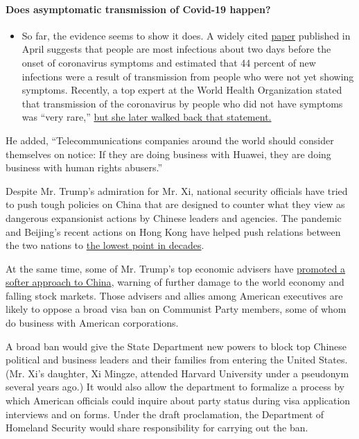 \begin{itemize}
{  \paragraph{Does asymptomatic transmission of Covid-19
  happen?}\label{does-asymptomatic-transmission-of-covid-19-happen}}

  \begin{itemize}
  \tightlist
  \item
    So far, the evidence seems to show it does. A widely cited
    \href{https://www.nature.com/articles/s41591-020-0869-5}{paper}
    published in April suggests that people are most infectious about
    two days before the onset of coronavirus symptoms and estimated that
    44 percent of new infections were a result of transmission from
    people who were not yet showing symptoms. Recently, a top expert at
    the World Health Organization stated that transmission of the
    coronavirus by people who did not have symptoms was ``very rare,''
    \href{https://www.nytimes.com/2020/06/09/world/coronavirus-updates.html?action=click\&pgtype=Article\&state=default\&region=MAIN_CONTENT_3\&context=storylines_faq\#link-1f302e21}{but
    she later walked back that statement.}
  \end{itemize}
\end{itemize}

He added, ``Telecommunications companies around the world should
consider themselves on notice: If they are doing business with Huawei,
they are doing business with human rights abusers.''

Despite Mr. Trump's admiration for Mr. Xi, national security officials
have tried to push tough policies on China that are designed to counter
what they view as dangerous expansionist actions by Chinese leaders and
agencies. The pandemic and Beijing's recent actions on Hong Kong have
helped push relations between the two nations to
\href{https://www.nytimes.com/2020/03/22/us/politics/coronavirus-us-china.html}{the
lowest point in decades}.

At the same time, some of Mr. Trump's top economic advisers have
\href{https://www.nytimes.com/2019/05/04/world/asia/trump-china-uighurs-trade-deal.html}{promoted
a softer approach to China}, warning of further damage to the world
economy and falling stock markets. Those advisers and allies among
American executives are likely to oppose a broad visa ban on Communist
Party members, some of whom do business with American corporations.

A broad ban would give the State Department new powers to block top
Chinese political and business leaders and their families from entering
the United States. (Mr. Xi's daughter, Xi Mingze, attended Harvard
University under a pseudonym several years ago.) It would also allow the
department to formalize a process by which American officials could
inquire about party status during visa application interviews and on
forms. Under the draft proclamation, the Department of Homeland Security
would share responsibility for carrying out the ban.

